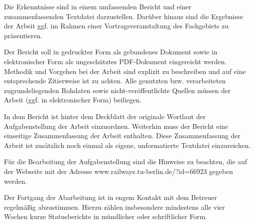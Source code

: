 Die Erkenntnisse sind in einem umfassenden Bericht und einer zusammenfassenden Textdatei darzustellen. Darüber hinaus sind die Ergebnisse der Arbeit ggf. im Rahmen einer Vortragsveranstaltung des Fachgebiets zu präsentieren.

Der Bericht soll in gedruckter Form als gebundenes Dokument sowie in elektronischer Form als ungeschütztes PDF-Dokument eingereicht werden. Methodik und Vorgehen bei der Arbeit sind explizit zu beschreiben und auf eine entsprechende Zitierweise ist zu achten. Alle genutzten bzw. verarbeiteten zugrundeliegenden Rohdaten sowie nicht-veröffentlichte Quellen müssen der Arbeit (ggf. in elektronischer Form) beiliegen.

In dem Bericht ist hinter dem Deckblatt der originale Wortlaut der Aufgabenstellung der Arbeit einzuordnen. Weiterhin muss der Bericht eine einseitige Zusammenfassung der Arbeit enthalten. Diese Zusammenfassung der Arbeit ist zusätzlich noch einmal als eigene, unformatierte Textdatei einzureichen.

Für die Bearbeitung der Aufgabenstellung sind die Hinweise zu beachten, die auf der Webseite mit der Adresse www.railways.tu-berlin.de/?id=66923 gegeben werden.

Der Fortgang der Abarbeitung ist in engem Kontakt mit dem Betreuer regelmäßig abzustimmen. Hierzu zählen insbesondere mindestens alle vier Wochen kurze Statusberichte in mündlicher oder schriftlicher Form.